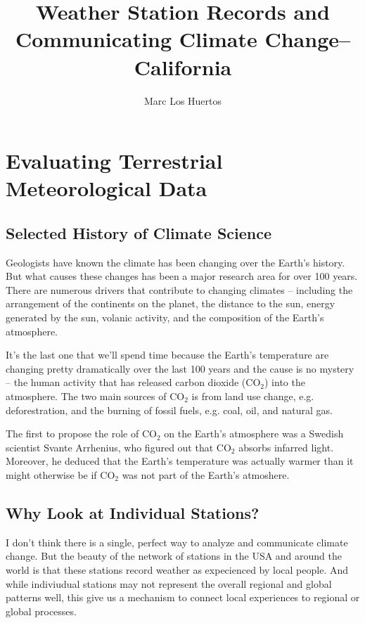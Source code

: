 \documentclass{article}\usepackage[]{graphicx}\usepackage[]{color}
\title{Weather Station Records and Communicating Climate Change--California}
\author{Marc Los Huertos}
\begin{document}
\maketitle

\tableofcontents

\section{Evaluating Terrestrial Meteorological Data}

\subsection{Selected History of Climate Science}

Geologists have known the climate has been changing over the Earth's history. But what causes these changes has been a major research area for over 100 years. There are numerous drivers that contribute to changing climates -- including the arrangement of the continents on the planet, the distance to the sun, energy generated by the sun, volanic activity, and the composition of the Earth's atmosphere. 

It's the last one that we'll spend time because the Earth's temperature are changing pretty dramatically over the last 100 years and the cause is no mystery -- the human activity that has released carbon dioxide (CO$_2$) into the atmosphere. The two main sources of CO$_2$ is from land use change, e.g. deforestration, and the burning of fossil fuels, e.g. coal, oil, and natural gas. 

The first to propose the role of CO$_2$ on the Earth's atmosphere was a Swedish scientist Svante Arrhenius, who figured out that CO$_2$ absorbs infarred light. Moreover, he deduced that the Earth's temperature was actually warmer than it might otherwise be if CO$_2$ was not part of the Earth's atmoshere. 

\subsection{Why Look at Individual Stations?}

I don't think there is a single, perfect way to analyze and communicate climate change. But the beauty of the network of stations in the USA and around the world is that these stations record weather as expecienced by local people. And while indiviudual stations may not represent the overall regional and global patterns well, this give us a mechanism to connect local experiences to regional or global processes. 
\end{document}
